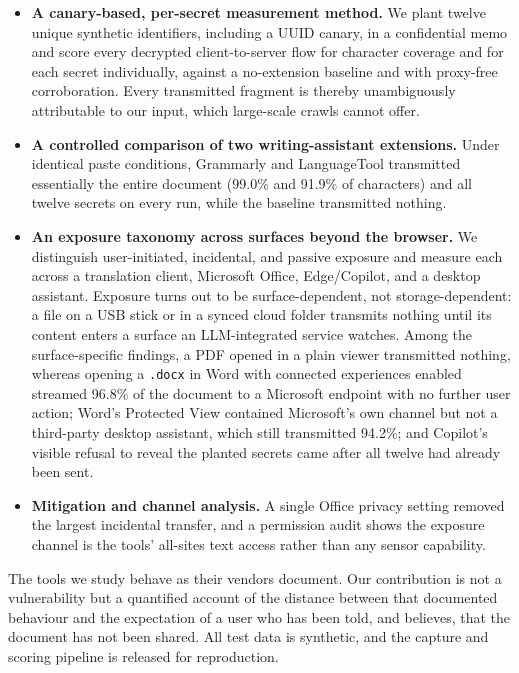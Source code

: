 \documentclass[sigconf,anonymous,review,balance=false]{acmart}
\begin{document}
\begin{itemize}
  \item \textbf{A canary-based, per-secret measurement method.} We plant twelve unique
        synthetic identifiers, including a UUID canary, in a confidential memo and score
        every decrypted client-to-server flow for character coverage and for each secret
        individually, against a no-extension baseline and with proxy-free corroboration.
        Every transmitted fragment is thereby unambiguously attributable to our input,
        which large-scale crawls cannot offer.
  \item \textbf{A controlled comparison of two writing-assistant extensions.} Under
        identical paste conditions, Grammarly and LanguageTool transmitted essentially the
        entire document (99.0\% and 91.9\% of characters) and all twelve secrets on every run,
        while the baseline transmitted nothing.
  \item \textbf{An exposure taxonomy across surfaces beyond the browser.} We distinguish
        user-initiated, incidental, and passive exposure and measure each across a
        translation client, Microsoft Office, Edge/Copilot, and a desktop assistant.
        Exposure turns out to be surface-dependent, not storage-dependent: a file on a USB
        stick or in a synced cloud folder transmits nothing until its content enters a
        surface an LLM-integrated service watches. Among the surface-specific findings, a
        PDF opened in a plain viewer transmitted nothing, whereas opening a \texttt{.docx}
        in Word with connected experiences enabled streamed 96.8\% of the document to a
        Microsoft endpoint with no further user action; Word's Protected View
        contained Microsoft's own channel but not a third-party desktop assistant, which
        still transmitted 94.2\%; and Copilot's visible refusal to reveal the planted secrets
        came after all twelve had already been sent.
  \item \textbf{Mitigation and channel analysis.} A single Office privacy setting removed the
        largest incidental transfer, and a permission audit shows the exposure channel is the
        tools' all-sites text access rather than any sensor capability.
\end{itemize}

The tools we study behave as their vendors document. Our contribution is not a
vulnerability but a quantified account of the distance between that documented behaviour
and the expectation of a user who has been told, and believes, that the document has not
been shared. All test data is synthetic, and the capture and scoring pipeline is released
for reproduction.
\end{document}
